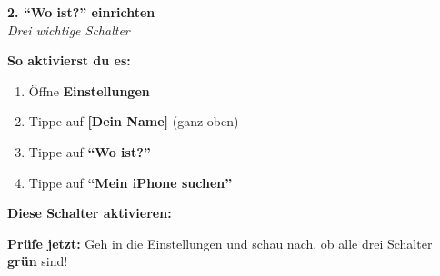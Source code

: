 \documentclass[a4paper,landscape,8pt]{extarticle}
\begin{document}
\hfill%
\begin{minipage}[t]{0.32\linewidth}
\begin{center}
\colorbox{appleblue!15}{%
\begin{minipage}{0.95\linewidth}
\vspace{2mm}
\begin{center}
{\Large\bfseries\textcolor{appleblue}{2. ``Wo ist?'' einrichten}}\\[1pt]
{\footnotesize\itshape Drei wichtige Schalter}
\end{center}
\vspace{2mm}
\end{minipage}%
}
\end{center}

\vspace{1mm}

\textbf{So aktivierst du es:}
\begin{enumerate}
\item Öffne \textbf{Einstellungen}
\item Tippe auf \textbf{[Dein Name]} (ganz oben)
\item Tippe auf \textbf{``Wo ist?''}
\item Tippe auf \textbf{``Mein iPhone suchen''}
\end{enumerate}

\textbf{Diese Schalter aktivieren:}


\vspace{2mm}

\textbf{Prüfe jetzt:} Geh in die Einstellungen und schau nach, ob alle drei Schalter \textbf{grün} sind!

\end{minipage}%
\hfill%
\end{document}
